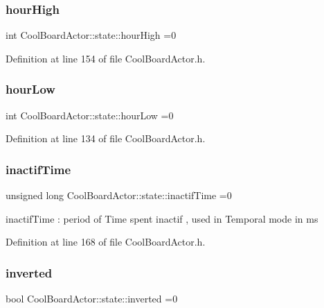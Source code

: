 \subsubsection{\texorpdfstring{hour\+High}{hourHigh}}
{\footnotesize\ttfamily int Cool\+Board\+Actor\+::state\+::hour\+High =0}



Definition at line 154 of file Cool\+Board\+Actor.\+h.

\mbox{\label{struct_cool_board_actor_1_1state_ae7034bf95b36f1392f9de076fa0c8c0f}} 
\subsubsection{\texorpdfstring{hour\+Low}{hourLow}}
{\footnotesize\ttfamily int Cool\+Board\+Actor\+::state\+::hour\+Low =0}



Definition at line 134 of file Cool\+Board\+Actor.\+h.

\mbox{\label{struct_cool_board_actor_1_1state_a6d88835f4402b3b81cd404784281854b}} 
\subsubsection{\texorpdfstring{inactif\+Time}{inactifTime}}
{\footnotesize\ttfamily unsigned long Cool\+Board\+Actor\+::state\+::inactif\+Time =0}

inactif\+Time \+: period of Time spent inactif , used in Temporal mode in ms 

Definition at line 168 of file Cool\+Board\+Actor.\+h.

\mbox{\label{struct_cool_board_actor_1_1state_aa4fdca81973fd7b29541877db1cf27bd}} 
\subsubsection{\texorpdfstring{inverted}{inverted}}
{\footnotesize\ttfamily bool Cool\+Board\+Actor\+::state\+::inverted =0}

